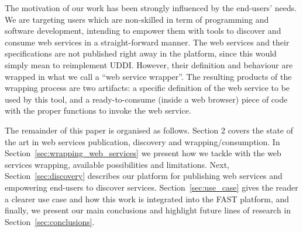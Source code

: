 The motivation of our work has been strongly influenced by the end-users' needs. We are targeting users which are non-skilled in term of programming and software development, intending to empower them with tools to discover and consume web services in a straight-forward manner.
The web services and their specifications are not published right away in the platform, since this would simply mean to reimplement UDDI.
However, their definition and behaviour are wrapped in what we call a ``web service wrapper''. The resulting products of the wrapping process are two artifacts: a specific definition of the web service to be used by this tool, and a ready-to-consume (inside a web browser) piece of code with the proper functions to invoke the web service.

The remainder of this paper is organised as follows. Section 2 covers the state of the art in web services publication, discovery and wrapping/consumption. In Section~\ref{sec:wrapping_web_services} we present how we tackle with the web services wrapping, available possibilities and limitations. Next, Section~\ref{sec:discovery} describes our platform for publishing web services and empowering end-users to discover services. Section~\ref{sec:use_case} gives the reader a clearer use case and how this work is integrated into the FAST platform, and finally, we present our main conclusions and highlight future lines of research in Section~\ref{sec:conclusions}.

